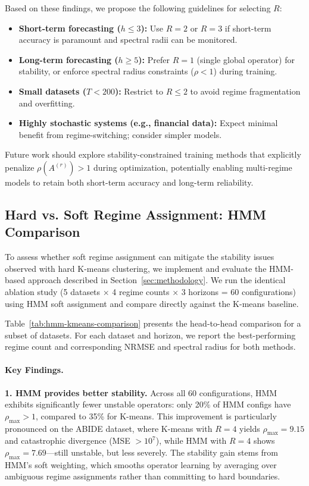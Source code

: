 \documentclass[journal, onecolumn]{IEEEtran}
\begin{document}
Based on these findings, we propose the following guidelines for selecting $R$:
\begin{itemize}
    \item \textbf{Short-term forecasting ($h \le 3$):} Use $R=2$ or $R=3$ if short-term accuracy is paramount and spectral radii can be monitored.
    \item \textbf{Long-term forecasting ($h \ge 5$):} Prefer $R=1$ (single global operator) for stability, or enforce spectral radius constraints ($\rho < 1$) during training.
    \item \textbf{Small datasets ($T < 200$):} Restrict to $R \le 2$ to avoid regime fragmentation and overfitting.
    \item \textbf{Highly stochastic systems (e.g., financial data):} Expect minimal benefit from regime-switching; consider simpler models.
\end{itemize}

Future work should explore stability-constrained training methods that explicitly penalize $\rho(A^{(r)}) > 1$ during optimization, potentially enabling multi-regime models to retain both short-term accuracy and long-term reliability.

\subsection{Hard vs. Soft Regime Assignment: HMM Comparison}
\label{sec:hmm-comparison}

To assess whether soft regime assignment can mitigate the stability issues observed with hard K-means clustering, we implement and evaluate the HMM-based approach described in Section~\ref{sec:methodology}. We run the identical ablation study (5 datasets $\times$ 4 regime counts $\times$ 3 horizons = 60 configurations) using HMM soft assignment and compare directly against the K-means baseline.

Table~\ref{tab:hmm-kmeans-comparison} presents the head-to-head comparison for a subset of datasets. For each dataset and horizon, we report the best-performing regime count and corresponding NRMSE and spectral radius for both methods.



\paragraph{Key Findings.}

\textbf{1. HMM provides better stability.}
Across all 60 configurations, HMM exhibits significantly fewer unstable operators: only 20\% of HMM configs have $\rho_{\max} > 1$, compared to 35\% for K-means. This improvement is particularly pronounced on the ABIDE dataset, where K-means with $R=4$ yields $\rho_{\max} = 9.15$ and catastrophic divergence (MSE $> 10^7$), while HMM with $R=4$ shows $\rho_{\max} = 7.69$---still unstable, but less severely. The stability gain stems from HMM's soft weighting, which smooths operator learning by averaging over ambiguous regime assignments rather than committing to hard boundaries.
\end{document}
